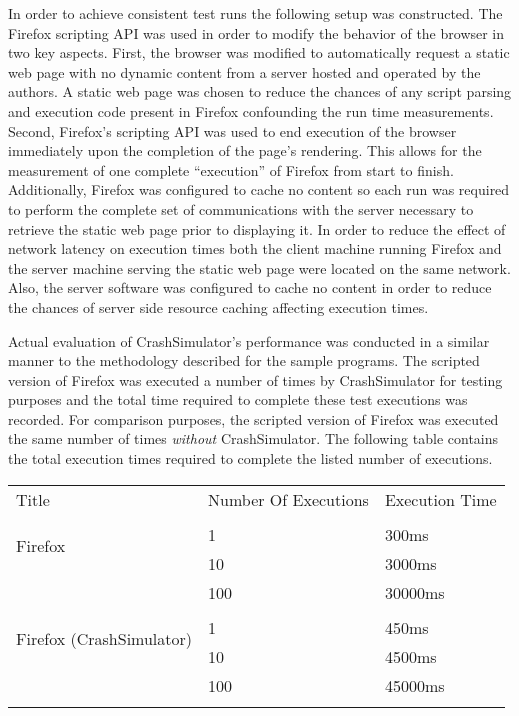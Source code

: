                 In order to achieve consistent test runs the following setup was constructed. The Firefox scripting API
                was used in order to modify the behavior of the browser in two key aspects. First, the browser was
                modified to automatically request a static web page with no dynamic content from a server hosted and
                operated by the authors. A static web page was chosen to reduce the chances of any script parsing and
                execution code present in Firefox confounding the run time measurements. Second, Firefox's scripting API
                was used to end execution of the browser immediately upon the completion of the page's rendering. This
                allows for the measurement of one complete ``execution'' of Firefox from start to finish. Additionally,
                Firefox was configured to cache no content so each run was required to perform the complete set of
                communications with the server necessary to retrieve the static web page prior to displaying it. In
                order to reduce the effect of network latency on execution times both the client machine running Firefox
                and the server machine serving the static web page were located on the same network. Also, the server
                software was configured to cache no content in order to reduce the chances of server side resource
                caching affecting execution times.

                Actual evaluation of CrashSimulator's performance was conducted in a similar manner to the methodology
                described for the sample programs. The scripted version of Firefox was executed a number of times by
                CrashSimulator for testing purposes and the total time required to complete these test executions was
                recorded. For comparison purposes, the scripted version of Firefox was executed the same number of times
                \emph{without} CrashSimulator.  The following table contains the total execution times required to
                complete the listed number of executions.

                \begin{tabular}{l l l}
                    \toprule{}
                    Title & Number Of Executions & Execution Time \\
                    \multirow{3}{*}{Firefox} \\
                    & 1 & 300ms \\
                    & 10 & 3000ms \\
                    & 100 & 30000ms \\
                    \multirow{3}{*}{Firefox (CrashSimulator)} \\
                    & 1 & 450ms \\
                    & 10 & 4500ms \\
                    & 100 & 45000ms \\
                    \bottomrule{}
                \end{tabular}

